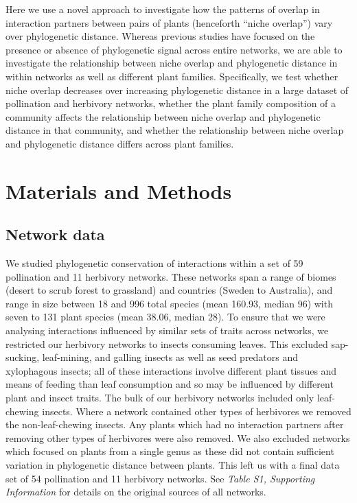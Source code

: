 \documentclass[12pt]{article}
\begin{document}
\begin{spacing}{1.5}
  Here we use a novel approach to investigate how the patterns of
  overlap in interaction partners between pairs of plants (henceforth
  ``niche overlap'') vary over phylogenetic distance. Whereas previous
  studies have focused on the presence or absence of phylogenetic
  signal across entire networks, we are able to investigate the
  relationship between niche overlap and phylogenetic distance in
  within networks as well as different plant families. Specifically,
  we test whether niche overlap decreases over increasing phylogenetic
  distance in a large dataset of pollination and herbivory networks, 
  whether the plant family composition of a community affects the
  relationship between niche overlap and phylogenetic distance in that community,
  and whether the relationship between niche overlap and phylogenetic
  distance differs across plant families.


\section*{Materials and Methods}

\subsection*{Network data}

  We studied phylogenetic conservation of interactions within a 
  set of 59 pollination and 11 herbivory networks. 
  These networks span a range of biomes 
  (desert to scrub forest to grassland) and countries (Sweden to 
  Australia), and range in size between 18 and 996 total species 
  (mean 160.93, median 96) with seven to 131 plant species (mean 38.06, 
  median 28).
  To ensure that we were analysing interactions influenced by similar
  sets of traits across networks, we restricted our herbivory 
  networks to insects consuming leaves. This excluded sap-sucking, 
  leaf-mining, and galling insects as well as seed predators and
  xylophagous insects; all of these interactions involve different 
  plant tissues and means of feeding
  than leaf consumption and so may be influenced by different
  plant and insect traits. The bulk of our herbivory networks 
  included only leaf-chewing insects. Where a network contained other
  types of herbivores we removed the non-leaf-chewing insects. Any
  plants which had no interaction partners after removing other types
  of herbivores were also removed. We also excluded networks which focused on
  plants from a single genus as these did not contain sufficient
  variation in phylogenetic distance between plants. This left us
  with a final data set of 54 pollination and 11 herbivory networks.
  See \emph{Table S1, Supporting Information} for details on the original 
  sources of all networks. 



\end{spacing}
\end{document}
